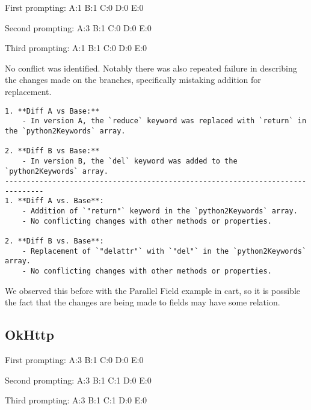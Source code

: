 First prompting:
A:1
B:1
C:0
D:0
E:0

Second prompting:
A:3
B:1
C:0
D:0
E:0

Third prompting:
A:1
B:1
C:0
D:0
E:0

No conflict was identified. Notably there was also repeated failure in describing the changes made on the branches, specifically mistaking addition for replacement.
\begin{lstlisting}
1. **Diff A vs Base:**
    - In version A, the `reduce` keyword was replaced with `return` in the `python2Keywords` array.
 
2. **Diff B vs Base:**
    - In version B, the `del` keyword was added to the `python2Keywords` array.
-------------------------------------------------------------------------------
1. **Diff A vs. Base**:
    - Addition of `"return"` keyword in the `python2Keywords` array.
    - No conflicting changes with other methods or properties.
 
2. **Diff B vs. Base**:
    - Replacement of `"delattr"` with `"del"` in the `python2Keywords` array.
    - No conflicting changes with other methods or properties.
\end{lstlisting}
We observed this before with the Parallel Field example in cart, so it is possible the fact that the changes are being made to fields may have some relation.

\subsection{OkHttp}

First prompting:
A:3
B:1
C:0
D:0
E:0

Second prompting:
A:3
B:1
C:1
D:0
E:0

Third prompting:
A:3
B:1
C:1
D:0
E:0

